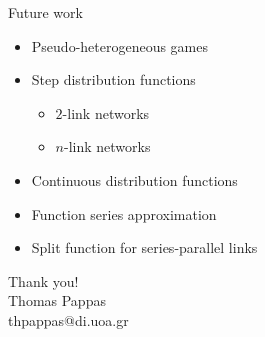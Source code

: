 \documentclass{beamer}
\begin{document}
\begin{frame}{Future work}
	\begin{itemize}
		\item Pseudo-heterogeneous games
		\item Step distribution functions
		\begin{itemize}
			\item $2$-link networks
			\item $n$-link networks
		\end{itemize}
		\item Continuous distribution functions
		\item Function series approximation
		\item Split function for series-parallel links
	\end{itemize}
\end{frame}

\begin{frame}{}
	\centering
    \huge Thank you!\\
    \normalsize Thomas Pappas\\
    thpappas@di.uoa.gr
\end{frame}
\end{document}
